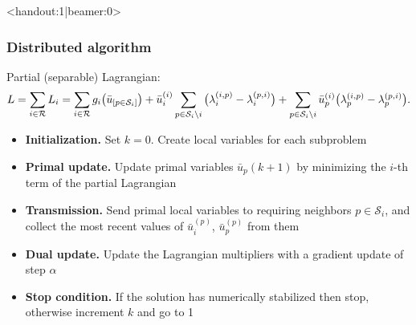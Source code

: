 \begin{frame}<handout:1|beamer:0>
    \frametitle{Distributed algorithm}
    Partial (separable) Lagrangian:
    \[
    L =\sum_{i\in\mathcal{R}} L_i =  \sum_{i\in\mathcal{R}} g_i \big(\bar{u}_{[p\in\mathcal{S}_i]}  \big) +
    \bar{u}_i^{(i)} \sum_{p\in\mathcal{S}_i\setminus i} \big( \lambda_i^{(i,p)} - \lambda_i^{(p,i)} \big) +
    \sum_{p\in\mathcal{S}_i\setminus i} \bar{u}_p^{(i)} \big( \lambda_p^{(i,p)} - \lambda_p^{(p,i)} \big).
    \]
    \begin{itemize}
    \item[]\textbf{Initialization.} Set $k=0$. Create local variables for each subproblem %
    \item[]\textbf{Primal update.} Update primal variables $\bar{u}_p(k+1)$ by minimizing the $i$-th term of the partial Lagrangian
    \item[]\textbf{Transmission.} Send primal local variables to requiring neighbors $p\in\mathcal{S}_i$, and collect the most recent values of $\bar{u}_i^{(p)}$, $\bar{u}_p^{(p)}$ from them
    \item[]\textbf{Dual update.} Update the Lagrangian multipliers with a gradient update of step $\alpha$
    \item[]\textbf{Stop condition.} If the solution has numerically stabilized then stop, otherwise increment $k$ and go to 1
    \end{itemize}
\end{frame}